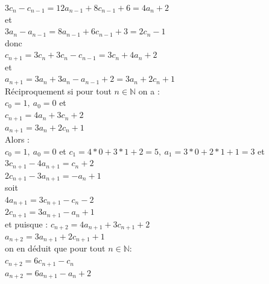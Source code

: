 \documentclass[a4paper,11pt]{book}
\newcommand{\N}{{\mathbb{N}}}
\begin{document}
\begin{enumerate}
$3c_n-c_{n-1}=12a_{n-1}+8c_{n-1}+6=4a_n+2$\\
et\\
$3a_n-a_{n-1}=8a_{n-1}+6c_{n-1}+3=2c_n-1$\\
donc \\
$c_{n+1}=3c_n+3c_n-c_{n-1}=3c_n+4a_n+2$\\
et\\
$a_{n+1}=3a_n+3a_n-a_{n-1}+2=3a_n+2c_n+1$\\
R\'eciproquement si pour tout $n \in \N$ on a :\\
$c_0=1,\ a_0=0$ et\\
$c_{n+1}=4a_n+3c_n+2$\\
$a_{n+1}=3a_n+2c_n+1$\\
Alors :\\
$c_0=1,\ a_0=0$ et $c_1=4*0+3*1+2=5,\ a_1=3*0+2*1+1=3$ et\\
$3c_{n+1}-4a_{n+1}=c_n+2$ \\
$2c_{n+1}-3a_{n+1}=-a_n+1$\\
soit\\
$4a_{n+1}=3c_{n+1}-c_n-2$\\
$2c_{n+1}=3a_{n+1}-a_n+1$\\
et puisque :
$c_{n+2}=4a_{n+1}+3c_{n+1}+2$\\
$a_{n+2}=3a_{n+1}+2c_{n+1}+1$\\
on en d\'eduit que pour tout $n \in \N$:\\
$c_{n+2}=6c_{n+1}-c_n$\\
$a_{n+2}=6a_{n+1}-a_n+2$


\end{enumerate}
\end{document}
